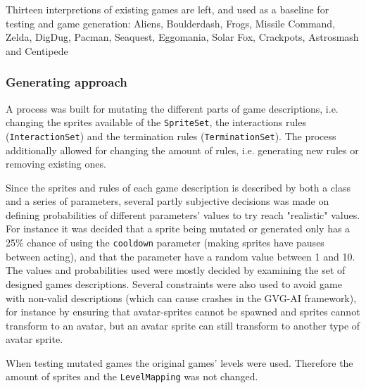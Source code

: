 \documentclass[a4paper,titlepage,final, twoside]{report}
\begin{document}
Thirteen interpretions of existing games are left, and used as a baseline for testing and game generation: Aliens, Boulderdash, Frogs, Missile Command, Zelda, DigDug, Pacman, Seaquest, Eggomania, Solar Fox, Crackpots, Astrosmash and Centipede





\subsubsection*{Generating approach}
A process was built for mutating the different parts of game descriptions, i.e. changing the sprites available of the \texttt{SpriteSet}, the interactions rules (\texttt{InteractionSet}) and the termination rules (\texttt{TerminationSet}).
The process additionally allowed for changing the amount of rules, i.e. generating new rules or removing existing ones.

Since the sprites and rules of each game description is described by both a class and a series of parameters, several partly subjective decisions was made on defining probabilities of different parameters' values to try reach "realistic" values.
For instance it was decided that a sprite being mutated or generated only has a 25\% chance of using the \texttt{cooldown} parameter (making sprites have pauses between acting), and that the parameter have a random value between 1 and 10.
The values and probabilities used were mostly decided by examining the set of designed games descriptions.
Several constraints were also used to avoid game with non-valid descriptions (which can cause crashes in the GVG-AI framework), for instance by ensuring that avatar-sprites cannot be spawned and sprites cannot transform to an avatar, but an avatar sprite can still transform to another type of avatar sprite.

When testing mutated games the original games' levels were used. Therefore the amount of sprites and the \texttt{LevelMapping} was not changed.
\end{document}
